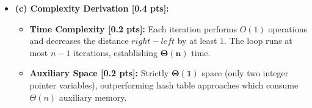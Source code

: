 \documentclass[11pt,a4paper]{article}
\begin{document}
\begin{solutionbox}
\begin{itemize}
\begin{itemize}
\begin{itemize}
        \end{itemize}
    \end{itemize}
    \item \textbf{(c) Complexity Derivation [0.4 pts]:}
    \begin{itemize}
        \item \textbf{Time Complexity [0.2 pts]:} Each iteration performs $O(1)$ operations and decreases the distance $right - left$ by at least $1$. The loop runs at most $n - 1$ iterations, establishing $\mathbf{\Theta(n)}$ time.
        \item \textbf{Auxiliary Space [0.2 pts]:} Strictly $\mathbf{\Theta(1)}$ space (only two integer pointer variables), outperforming hash table approaches which consume $\Theta(n)$ auxiliary memory.
    \end{itemize}
\end{itemize}
\end{solutionbox}

\vspace{0.4em}
\end{document}

